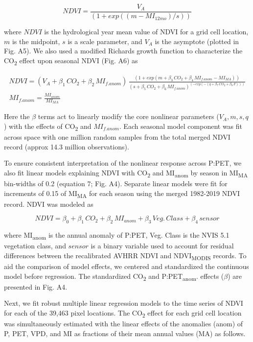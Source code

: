 \documentclass[
]{article}
\begin{document}
\begin{equation}
NDVI = \frac{V_A}{(1+exp((m-MI_{12mo})/s))}
\end{equation}

where \(NDVI\) is the hydrological year mean value of NDVI for a grid
cell location, \(m\) is the midpoint, \(s\) is a scale parameter, and
\(V_A\) is the asymptote (plotted in Fig. A5). We also used a modified
Richards growth function to characterize the CO\textsubscript{2} effect
upon seasonal NDVI (Fig. A6) as

\begin{align}
NDVI=(V_A+\beta_1\,CO_2+\beta_2\,MI_{f.anom})\,\frac{(1+exp(m+\beta_3\,CO_2+\beta_4\,MI_{f.anom} - MI_{MA}))}{(s+\beta_5\,CO_2+\beta_6\,MI_{f.anom})^{(-exp(-(q+\beta_7\,CO_2+\beta_8\,F)))}}\\
MI_{f.anom} = \frac{MI_{anom}}{MI_{MA}}\nonumber
\end{align}

Here the \(\beta\) terms act to linearly modify the core nonlinear
parameters (\(V_A, m, s, q\)) with the effects of CO\textsubscript{2}
and \(MI_{f.anom}\). Each seasonal model component was fit across space
with one million random samples from the total merged NDVI record
(approx 14.3 million observations).

To ensure consistent interpretation of the nonlinear response across
P:PET, we also fit linear models explaining NDVI with
CO\textsubscript{2} and MI\textsubscript{anom} by season in
MI\textsubscript{MA} bin-widths of 0.2 (equation 7; Fig. A4). Separate
linear models were fit for increments of 0.15 of MI\textsubscript{MA}
for each season using the merged 1982-2019 NDVI record. NDVI was modeled
as

\begin{equation}
NDVI = \beta_0+\beta_1\,CO_2 + \beta_2\,MI_{anom}+\beta_3\,Veg.\,Class+\beta_4\,sensor
\end{equation}

where MI\textsubscript{anom} is the annual anomaly of P:PET, Veg. Class
is the NVIS 5.1 vegetation class, and \(sensor\) is a binary variable
used to account for residual differences between the recalibrated AVHRR
NDVI and NDVI\textsubscript{MODIS} records. To aid the comparison of
model effects, we centered and standardized the continuous model before
regression. The standardized CO\textsubscript{2} and
P:PET\textsubscript{anom}. effects (\(\beta\)) are presented in Fig. A4.

Next, we fit robust multiple linear regression models to the time series
of NDVI for each of the 39,463 pixel locations. The CO\textsubscript{2}
effect for each grid cell location was simultaneously estimated with the
linear effects of the anomalies (anom) of P, PET, VPD, and MI as
fractions of their mean annual values (MA) as follows.
\end{document}
